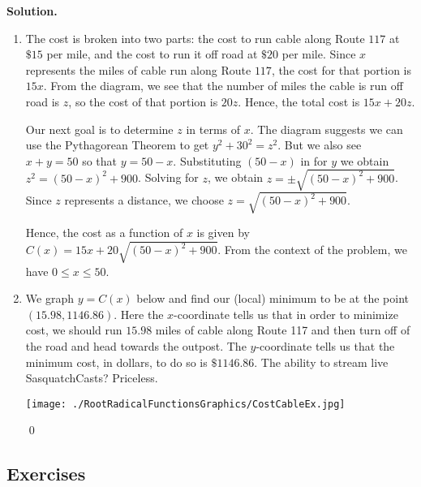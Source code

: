 \documentclass{ximera}
\begin{document}
\begin{example}
{\bf Solution.}

\begin{enumerate}

\item  The cost is broken into two parts:  the cost to run cable along Route $117$ at $\$15$ per mile, and the cost to run it off road at $\$20$ per mile.  Since $x$ represents the miles of cable run along Route $117$, the cost  for that portion is $15x$.  
From the diagram, we see that the number of miles the cable is run off road is $z$, so the cost of that portion is $20z$.  Hence, the total cost is $15x + 20z$.  

\smallskip

Our next goal is to determine $z$ in terms of $x$.  The diagram suggests we can use the Pythagorean Theorem to get $y^2+30^2 = z^2$.  But we also see $x+y = 50$ so that $y=50-x$.  Substituting $(50-x)$ in for $y$ we obtain $z^2 = (50-x)^2+900$.  Solving for $z$, we obtain $z = \pm \sqrt{(50-x)^2+900}$.  Since $z$ represents a distance, we choose $z = \sqrt{(50-x)^2+900}$.

Hence, the cost as a function of $x$  is given by $C(x) = 15x + 20\sqrt{(50-x)^2+900}$.  From the context of the problem, we have $0 \leq x \leq 50$.


\begin{center}
\end{center}

\item  We graph $y=C(x)$ below and find our (local) minimum to be at the point $(15.98, 1146.86)$.  Here the $x$-coordinate tells us that in order to minimize cost, we should run $15.98$ miles of cable along Route 117 and then turn off of the road and head towards the outpost. The $y$-coordinate tells us that the minimum cost, in dollars, to do so is $\$1146.86$.  The ability to stream live SasquatchCasts?  Priceless.

\medskip

\centerline{\texttt{[image: ./RootRadicalFunctionsGraphics/CostCableEx.jpg]}}


 \qed

\end{enumerate}

\end{example}

\newpage

\subsection{Exercises}


\closegraphsfile
\end{document}
